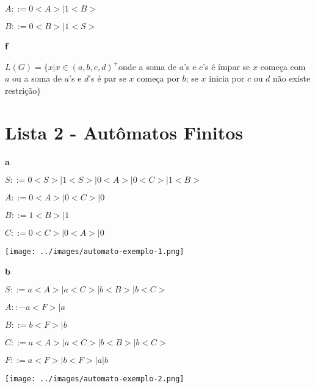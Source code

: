 \documentclass[ ]{article}
\begin{document}
	$A::= 0<A> | 1<B>$ %
	
	$B::= 0<B> | 1<S> $ %
	
	\textbf{f}
	
	$L(G) = \{ x | x \in (a,b,c,d)^+$onde a soma de $a$'s e $c$'s é ímpar se $x$ começa com $a$ ou a soma de $a$'s e $d$'s é par se $x$ começa por $b$; se $x$ inicia por $c$ ou $d$ não existe restrição$\}$
	\section*{Lista 2 - Autômatos Finitos}
		\textbf{a}
		
		$S::= 0<S> | 1<S> | 0<A> | 0<C> | 1<B>$
		
		$A::= 0<A> | 0<C> | 0$
		
		$B::= 1<B> | 1$
		
		$C::= 0<C> | 0<A> | 0$
		
		\texttt{[image: ../images/automato-exemplo-1.png]}
		
		\textbf{b}
		
		$S::= a<A> | a<C> | b<B> | b<C>$
		
		$A::- a<F> | a$
		
		$B::= b<F> | b$
		
		$C::= a<A> | a<C> | b<B> | b<C>$
		
		$F::= a<F> | b<F> | a | b$
		
		\texttt{[image: ../images/automato-exemplo-2.png]}
\end{document}
